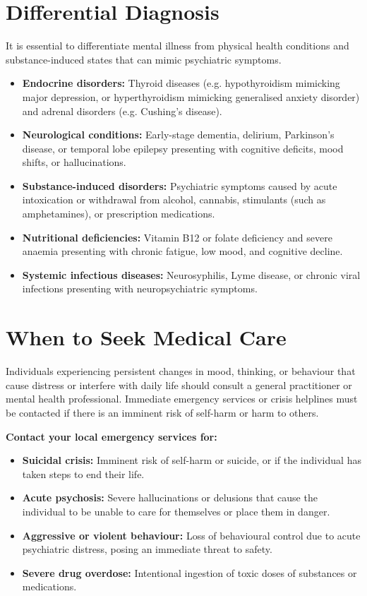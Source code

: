 \section*{Differential Diagnosis}
It is essential to differentiate mental illness from physical health conditions and substance-induced states that can mimic psychiatric symptoms.
\begin{itemize}
    \item \textbf{Endocrine disorders:} Thyroid diseases (e.g. hypothyroidism mimicking major depression, or hyperthyroidism mimicking generalised anxiety disorder) and adrenal disorders (e.g. Cushing's disease).
    \item \textbf{Neurological conditions:} Early-stage dementia, delirium, Parkinson's disease, or temporal lobe epilepsy presenting with cognitive deficits, mood shifts, or hallucinations.
    \item \textbf{Substance-induced disorders:} Psychiatric symptoms caused by acute intoxication or withdrawal from alcohol, cannabis, stimulants (such as amphetamines), or prescription medications.
    \item \textbf{Nutritional deficiencies:} Vitamin B12 or folate deficiency and severe anaemia presenting with chronic fatigue, low mood, and cognitive decline.
    \item \textbf{Systemic infectious diseases:} Neurosyphilis, Lyme disease, or chronic viral infections presenting with neuropsychiatric symptoms.
\end{itemize}

\section*{When to Seek Medical Care}
Individuals experiencing persistent changes in mood, thinking, or behaviour that cause distress or interfere with daily life should consult a general practitioner or mental health professional. Immediate emergency services or crisis helplines must be contacted if there is an imminent risk of self-harm or harm to others.

\textbf{Contact your local emergency services for:}
\begin{itemize}
    \item \textbf{Suicidal crisis:} Imminent risk of self-harm or suicide, or if the individual has taken steps to end their life.
    \item \textbf{Acute psychosis:} Severe hallucinations or delusions that cause the individual to be unable to care for themselves or place them in danger.
    \item \textbf{Aggressive or violent behaviour:} Loss of behavioural control due to acute psychiatric distress, posing an immediate threat to safety.
    \item \textbf{Severe drug overdose:} Intentional ingestion of toxic doses of substances or medications.
\end{itemize}

